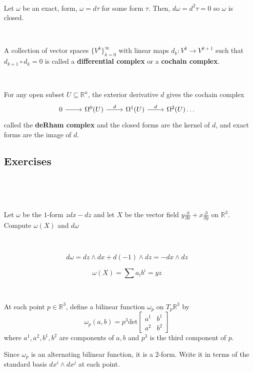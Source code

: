 \documentclass{article}
\begin{document}
\begin{customproof}
  \

  Let $\omega$ be an exact, form, $\omega = d\tau$ for some form $\tau$. Then, $d\omega= d^2\tau = 0$ so $\omega$ is closed.
\end{customproof}

\begin{definition}
  \

  A collection of vector spaces $\{V^k\}_{k = 0}^\infty$ with linear maps $d_k: V^k \to V^{k+1}$ such that $d_{k+1} \circ d_k = 0$ is called a \textbf{differential complex} or a \textbf{cochain complex}.
\end{definition}

\begin{definition}
  \

  For any open subset $U \subseteq \mathbb{R}^n$, the exterior derivative $d$ gives the cochain complex \[
    \begin{tikzcd}
      0 & \Omega^0(U) & \Omega^1(U) & \Omega^2(U)  \dots
      \arrow[from=1-1, to=1-2]
      \arrow[from=1-2, to=1-3, "d"]
      \arrow[from=1-3, to=1-4, "d"]
  \end{tikzcd}\]called the \textbf{deRham complex} and the closed forms are the kernel of $d$, and exact forms are the image of $d$.
\end{definition}

\subsection{Exercises}
\

\begin{exercise}[4.1]
  \

  Let $\omega$ be the $1$-form $zdx - dz$ and let $X$ be the vector field $y \frac{\partial }{\partial x} + x\frac{\partial}{\partial y}$ on $\mathbb{R}^3$. Compute $\omega(X)$ and $d\omega$
\end{exercise}

\begin{solution}
  \

  $$d \omega = dz \wedge dx + d(-1) \wedge dz = - dx \wedge dz$$

  $$\omega(X) = \sum a_ib^i = yz$$
\end{solution}

\begin{exercise}[4.2]
  \

  At each point $p \in \mathbb{R}^3$, define a bilinear function $\omega_p$ on $T_p \mathbb{R}^3$ by $$\omega_p(a,b) = p^3 \text{det}
  \begin{bmatrix}
    a^1 & b^1\\
    a^2 & b^2
  \end{bmatrix}$$where $a^1, a^2, b^1, b^2$ are components of $a,b$ and $p^3$ is the third component of $p$.

  Since $\omega_p$ is an alternating bilinear function, it is a $2$-form. Write it in terms of the standard basis $dx^i \wedge dx^j$ at each point.
\end{exercise}
\end{document}
